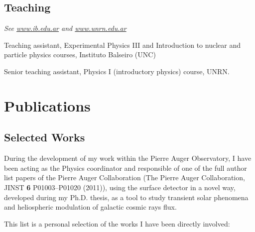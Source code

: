 \documentclass[11pt, a4paper]{article}
\renewenvironment{itemize}{
  \begin{list}{}{
    \setlength{\leftmargin}{0em}
    \setlength{\itemsep}{0.25em}
    \setlength{\parskip}{0pt}
    \setlength{\parsep}{.250em}
  }
}{
  \end{list}
}
\begin{document}
\subsection*{Teaching}
{\small{\textit{See \href{http://www.ib.edu.ar}{www.ib.edu.ar} and
\href{http://www.unrn.edu.ar}{www.unrn.edu.ar}}}}
\begin{itemize}
\item Teaching assistant, Experimental Physics III and Introduction to nuclear
and particle physics courses, Instituto Balseiro (UNC)
\item Senior teaching assistant, Physics I (introductory physics) course, UNRN.
\end{itemize}

\section*{Publications}
\noindent
\subsection*{Selected Works}
\noindent
During the development of my work within the Pierre Auger Observatory, I have
been acting as the Physics coordinator and responsible of one of the full
author list papers of the Pierre Auger Collaboration (The Pierre Auger
Collaboration, JINST {\bf 6} P01003--P01020 (2011)), using the surface detector
in a novel way, developed during my Ph.D. thesis, as a tool to study transient
solar phenomena and heliospheric modulation of galactic cosmic rays flux. 

This list is a personal selection of the works I have been directly involved:
\end{document}
